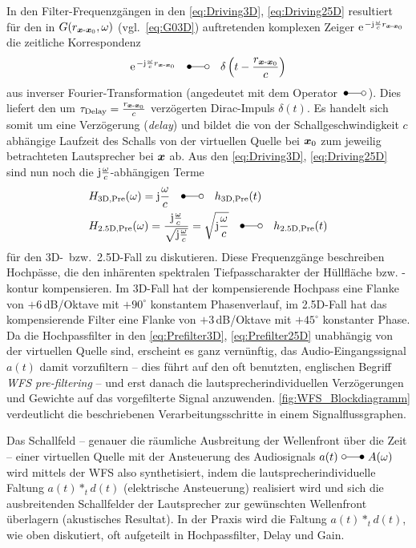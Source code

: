 In den Filter-Frequenzgängen in den \Glgn\eqref{eq:Driving3D}, \eqref{eq:Driving25D}
resultiert für den in $G(r_{\bm{x}\text{-}\bm{x}_\mathrm{0}},\omega)$ (vgl.~\Glg\eqref{eq:G03D})
auftretenden komplexen Zeiger
$\e^{-\im\wc r_{\xs\text{-}\xp}}$
die zeitliche Korrespondenz
\begin{align}
\e^{-\im\wc r_{\xs\text{-}\xp}}
\quad\Laplace\quad
\delta\left(t-\frac{r_{\xs\text{-}\xp}}{c}\right)
\end{align}
aus inverser Fourier-Transformation (angedeutet mit dem Operator $\,\Laplace\,$).
%
Dies liefert den um
$\tau_\text{Delay}=\frac{r_{\bm{x}\text{-}\bm{x}_\mathrm{0}}}{c}$
verzögerten Dirac-Impuls
$\delta(t)$.
%
Es handelt sich somit um eine Verzögerung (\textit{delay}) und
bildet die von der Schallgeschwindigkeit $c$ abhängige Laufzeit des Schalls
von der virtuellen Quelle bei $\bm{x}_\mathrm{0}$ zum jeweilig betrachteten Lautsprecher bei
$\bm{x}$ ab.
%
Aus den \Glgn\eqref{eq:Driving3D}, \eqref{eq:Driving25D} sind nun noch die
$\im\frac{\omega}{c}$-abhängigen Terme
%
\begin{align}
&H_\text{3D,Pre}(\omega) = \im\frac{\omega}{c} \quad\Laplace\quad h_\text{3D,Pre}(t)
\label{eq:Prefilter3D}\\
%
&H_\text{2.5D,Pre}(\omega) = \frac{\im\frac{\omega}{c}}{\sqrt{\im\frac{\omega}{c}}} = \sqrt{\im\frac{\omega}{c}} \quad\Laplace\quad h_\text{2.5D,Pre}(t)
\label{eq:Prefilter25D}
\end{align}
%
für den 3D-~bzw.~2.5D-Fall zu diskutieren.
%
Diese Frequenzgänge beschreiben Hochpässe, die den inhärenten
spektralen Tiefpasscharakter der Hüllfläche bzw. -kontur kompensieren.
%
Im 3D-Fall hat der kompensierende Hochpass eine Flanke von $+6$\,dB/Oktave mit
$+90^\circ$ konstantem Phasenverlauf, im 2.5D-Fall hat das kompensierende Filter
eine Flanke von $+3$\,dB/Oktave mit $+45^\circ$ konstanter Phase.
%
Da die Hochpassfilter in den \Glgn\eqref{eq:Prefilter3D}, \eqref{eq:Prefilter25D}
unabhängig von der virtuellen Quelle sind, erscheint es ganz vernünftig,
das Audio-Eingangssignal $a(t)$ damit vorzufiltern -- dies führt auf den
oft benutzten, englischen Begriff
\textit{WFS pre-filtering} -- und
erst danach die lautsprecherindividuellen Verzögerungen und Gewichte
auf das vorgefilterte Signal anzuwenden.
%
\Abb\ref{fig:WFS_Blockdiagramm} verdeutlicht die beschriebenen
Verarbeitungsschritte in einem Signalflussgraphen.



Das Schallfeld -- genauer die räumliche Ausbreitung der Wellenfront über die
Zeit -- einer virtuellen Quelle mit der Ansteuerung des Audiosignals
$a(t) \,\,\laplace\,\, A(\omega)$
wird mittels der WFS also synthetisiert, indem die lautsprecherindividuelle
Faltung $a(t) \ast_t d(t)$ (elektrische Ansteuerung) realisiert wird und
sich die ausbreitenden Schallfelder der Lautsprecher zur gewünschten Wellenfront
überlagern (akustisches Resultat).
%
In der Praxis wird die Faltung $a(t) \ast_t d(t)$, wie oben diskutiert,
oft aufgeteilt in Hochpassfilter, Delay und Gain.




